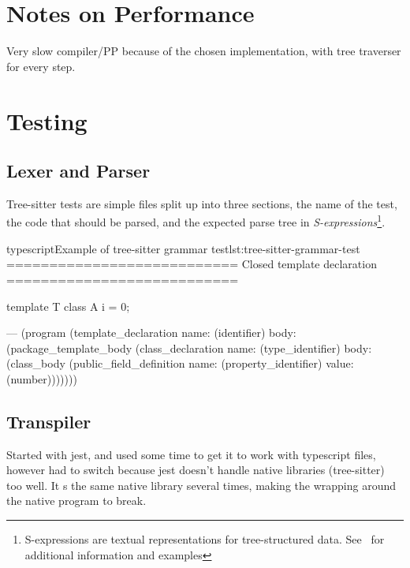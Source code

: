\section{Notes on Performance}\label{sec:notes-on-performance}

Very slow compiler/PP because of the chosen implementation, with tree traverser for every step.


\section{Testing}\label{sec:testing}

\subsection{Lexer and Parser}\label{subsec:testing-lexer-and-parser}

Tree-sitter tests are simple  files split up into three sections, the name of the test, the code that should be parsed, and the expected parse tree in \textit{S-expressions}\footnote{S-expressions are textual representations for tree-structured data. See~\cite{sexprs} for additional information and examples}.

\begin{code}{typescript}{Example of tree-sitter grammar test}{lst:tree-sitter-grammar-test}
    ===========================
    Closed template declaration
    ===========================

    template T {
        class A {
            i = 0;
        }
    }

    ---
    (program
        (template_declaration
            name: (identifier)
            body: (package_template_body
                    (class_declaration
                        name: (type_identifier)
                        body: (class_body
                            (public_field_definition
                                name: (property_identifier)
                                value: (number)))))))

\end{code}

\subsection{Transpiler}\label{subsec:testing-transpiler}

Started with jest, and used some time to get it to work with typescript files, however had to switch because jest doesn't handle native libraries (tree-sitter) too well.
It s the same native library several times, making the wrapping around the native program to break.